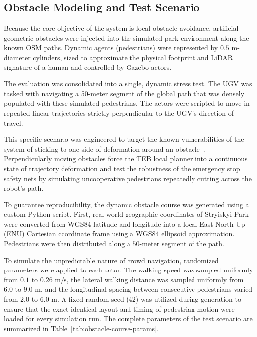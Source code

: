 \subsection{Obstacle Modeling and Test Scenario}
\label{subsec:test-scenario}

Because the core objective of the system is local obstacle avoidance, artificial geometric obstacles were injected into the simulated park environment along the known OSM paths. Dynamic agents (pedestrians) were represented by $0.5\text{ m}$-diameter cylinders, sized to approximate the physical footprint and LiDAR signature of a human and controlled by Gazebo actors.

The evaluation was consolidated into a single, dynamic stress test. The UGV was tasked with navigating a 50-meter segment of the global path that was densely populated with these simulated pedestrians. The actors were scripted to move in repeated linear trajectories strictly perpendicular to the UGV's direction of travel. 

This specific scenario was engineered to target the known vulnerabilities of the system of sticking to one side of deformation around an obstacle~\cite{rosmann2012teb}. Perpendicularly moving obstacles force the TEB local planner into a continuous state of trajectory deformation and test the robustness of the emergency stop safety nets by simulating uncooperative pedestrians repeatedly cutting across the robot's path.

To guarantee reproducibility, the dynamic obstacle course was generated using a custom Python script. First, real-world geographic coordinates of Stryiskyi Park were converted from WGS84 latitude and longitude into a local East-North-Up (ENU) Cartesian coordinate frame using a WGS84 ellipsoid approximation. Pedestrians were then distributed along a $50$-meter segment of the path.

To simulate the unpredictable nature of crowd navigation, randomized parameters were applied to each actor. The walking speed was sampled uniformly from $0.1$ to $0.26\text{ m/s}$, the lateral walking distance was sampled uniformly from $6.0$ to $9.0\text{ m}$, and the longitudinal spacing between consecutive pedestrians varied from $2.0$ to $6.0\text{ m}$. A fixed random seed ($42$) was utilized during generation to ensure that the exact identical layout and timing of pedestrian motion were loaded for every simulation run. The complete parameters of the test scenario are summarized in Table~\ref{tab:obstacle-course-params}.

